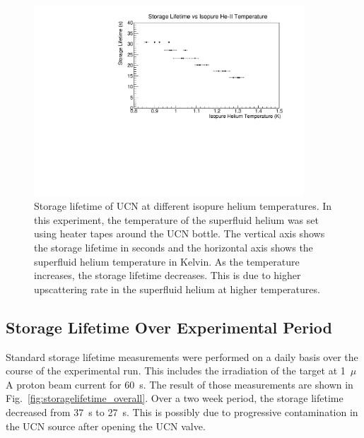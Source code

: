\begin{figure}[h!]
  \centering
  \includegraphics[width=0.9\textwidth]{StorageLifetime_vs_temp.pdf}
  \caption[UCN storage lifetime at different isopure helium
  temperatures]{Storage lifetime of UCN at different isopure helium
    temperatures. In this experiment, the temperature of the
    superfluid helium was set using heater tapes around the UCN
    bottle. The vertical axis shows the storage lifetime in seconds
    and the horizontal axis shows the superfluid helium temperature in
    Kelvin. As the temperature increases, the storage lifetime
    decreases. This is due to higher upscattering rate in the
    superfluid helium at higher temperatures.}
  \label{fig:storagelifetime_vs_temp}
\end{figure}



\subsection{Storage Lifetime Over Experimental Period\label{sec:storage_overall}}

Standard storage lifetime measurements were performed on a daily basis
over the course of the experimental run. This includes the irradiation
of the target at 1~$\mu$A proton beam current for 60~s. The result of
those measurements are shown in
Fig.~\ref{fig:storagelifetime_overall}. Over a two week period, the
storage lifetime decreased from 37~s to 27~s. This is possibly due to
progressive contamination in the UCN source after opening the UCN
valve.


